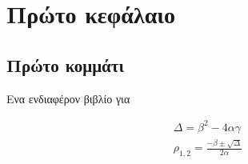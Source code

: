 \chapter{Πρώτο κεφάλαιο}

\section{Πρώτο κομμάτι}

Ενα ενδιαφέρον βιβλίο για 

\begin{align}
    Δ = β^2 - 4 α γ \\
    ρ_{1,2} = \frac{-β \pm \sqrt{Δ}}{2α}
\end{align}
